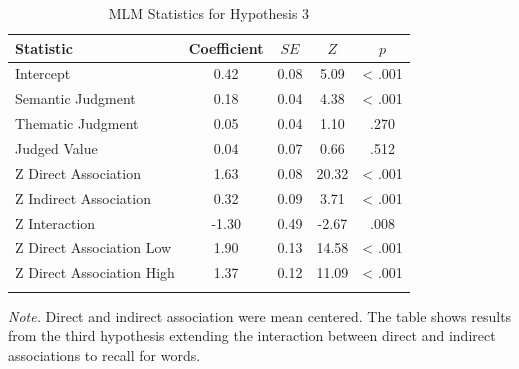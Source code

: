 \documentclass[english,,man]{apa6}
\begin{document}
\begin{table}[tbp]
\begin{center}
\begin{threeparttable}
\caption{\label{tab:hyp3-table}MLM Statistics for Hypothesis 3}
\begin{tabular}{lcccc}
\toprule
Statistic & \multicolumn{1}{c}{Coefficient} & \multicolumn{1}{c}{$SE$} & \multicolumn{1}{c}{$Z$} & \multicolumn{1}{c}{$p$}\\
\midrule
Intercept & 0.42 & 0.08 & 5.09 & < .001\\
Semantic Judgment & 0.18 & 0.04 & 4.38 & < .001\\
Thematic Judgment & 0.05 & 0.04 & 1.10 & .270\\
Judged Value & 0.04 & 0.07 & 0.66 & .512\\
Z Direct Association & 1.63 & 0.08 & 20.32 & < .001\\
Z Indirect Association & 0.32 & 0.09 & 3.71 & < .001\\
Z Interaction & -1.30 & 0.49 & -2.67 & .008\\
Z Direct Association Low & 1.90 & 0.13 & 14.58 & < .001\\
Z Direct Association High & 1.37 & 0.12 & 11.09 & < .001\\
\bottomrule
\addlinespace
\end{tabular}
\begin{tablenotes}[para]
\normalsize{\textit{Note.} Direct and indirect association were mean centered. The table shows results from the third hypothesis extending the interaction between direct and indirect associations to recall for words.}
\end{tablenotes}
\end{threeparttable}
\end{center}
\end{table}
\end{document}
